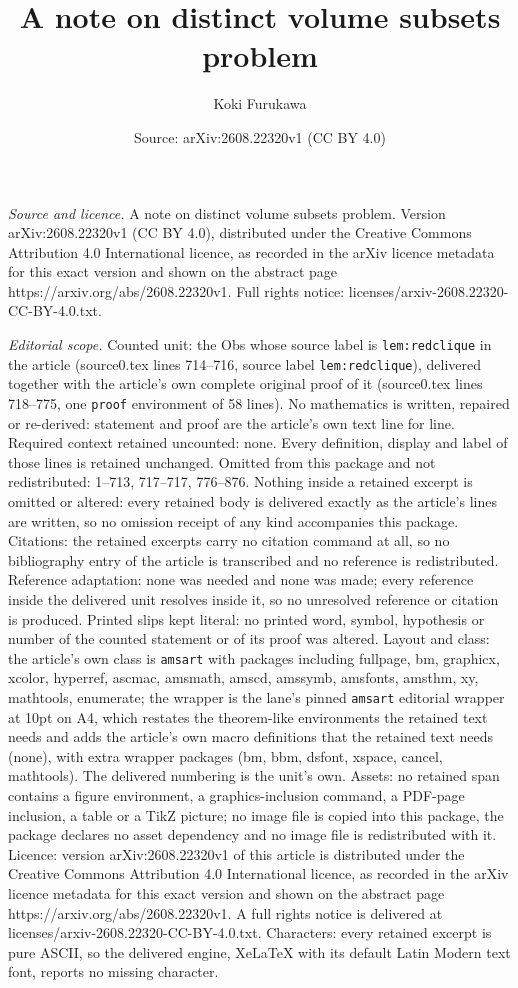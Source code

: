 \documentclass[10pt,a4paper]{amsart}
\title[A note on distinct volume subsets problem]{A note on distinct volume subsets problem}
\author{Koki Furukawa}
\date{Source: arXiv:2608.22320v1 (CC BY 4.0)}
\begin{document}
\maketitle

\noindent\emph{Source and licence.} A note on distinct volume subsets problem. Version arXiv:2608.22320v1 (CC BY 4.0), distributed under the Creative Commons Attribution 4.0 International licence, as recorded in the arXiv licence metadata for this exact version and shown on the abstract page https://arxiv.org/abs/2608.22320v1. Full rights notice: licenses/arxiv-2608.22320-CC-BY-4.0.txt.\par\smallskip

\noindent\textit{Editorial scope.} Counted unit: the Obs whose source label is \texttt{lem:redclique} in the article (source0.tex lines 714--716, source label \texttt{lem:redclique}), delivered together with the article's own complete original proof of it (source0.tex lines 718--775, one \texttt{proof} environment of 58 lines). No mathematics is written, repaired or re-derived: statement and proof are the article's own text line for line. Required context retained uncounted: none. Every definition, display and label of those lines is retained unchanged. Omitted from this package and not redistributed: 1--713, 717--717, 776--876. Nothing inside a retained excerpt is omitted or altered: every retained body is delivered exactly as the article's lines are written, so no omission receipt of any kind accompanies this package. Citations: the retained excerpts carry no citation command at all, so no bibliography entry of the article is transcribed and no reference is redistributed. Reference adaptation: none was needed and none was made; every reference inside the delivered unit resolves inside it, so no unresolved reference or citation is produced. Printed slips kept literal: no printed word, symbol, hypothesis or number of the counted statement or of its proof was altered. Layout and class: the article's own class is \texttt{amsart} with packages including fullpage, bm, graphicx, xcolor, hyperref, ascmac, amsmath, amscd, amssymb, amsfonts, amsthm, xy, mathtools, enumerate; the wrapper is the lane's pinned \texttt{amsart} editorial wrapper at 10pt on A4, which restates the theorem-like environments the retained text needs and adds the article's own macro definitions that the retained text needs (none), with extra wrapper packages (bm, bbm, dsfont, xspace, cancel, mathtools). The delivered numbering is the unit's own. Assets: no retained span contains a figure environment, a graphics-inclusion command, a PDF-page inclusion, a table or a TikZ picture; no image file is copied into this package, the package declares no asset dependency and no image file is redistributed with it. Licence: version arXiv:2608.22320v1 of this article is distributed under the Creative Commons Attribution 4.0 International licence, as recorded in the arXiv licence metadata for this exact version and shown on the abstract page https://arxiv.org/abs/2608.22320v1. A full rights notice is delivered at licenses/arxiv-2608.22320-CC-BY-4.0.txt. Characters: every retained excerpt is pure ASCII, so the delivered engine, XeLaTeX with its default Latin Modern text font, reports no missing character.
\end{document}
